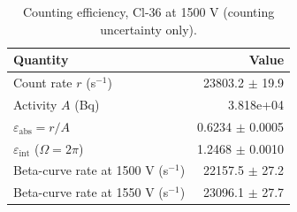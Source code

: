 \begin{table}[htbp]
\centering
\caption{Counting efficiency, Cl-36 at 1500 V (counting uncertainty only).}
\label{tab:eff}
\begin{tabular}{lr}
\toprule
Quantity & Value \\
\midrule
Count rate $r$ (s$^{-1}$) & 23803.2 $\pm$ 19.9 \\
Activity $A$ (Bq) & 3.818e+04 \\
$\varepsilon_{\mathrm{abs}} = r/A$ & 0.6234 $\pm$ 0.0005 \\
$\varepsilon_{\mathrm{int}}$ ($\Omega = 2\pi$) & 1.2468 $\pm$ 0.0010 \\
Beta-curve rate at 1500 V (s$^{-1}$) & 22157.5 $\pm$ 27.2 \\
Beta-curve rate at 1550 V (s$^{-1}$) & 23096.1 $\pm$ 27.7 \\
\bottomrule
\end{tabular}
\end{table}
